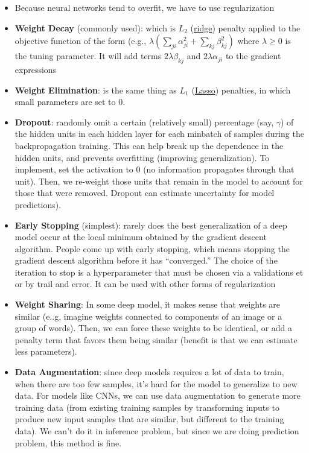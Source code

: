\documentclass[
]{book}
\begin{document}
\begin{itemize}
  \begin{itemize}
  \item
    Because neural networks tend to overfit, we have to use regularization
  \item
    \textbf{Weight Decay} (commonly used): which is \(L_2\) (\protect\hyperlink{ridge-regression}{ridge}) penalty applied to the objective function of the form (e.g., \(\lambda(\sum_{ji} \alpha_{ji}^2 + \sum_{kj} \beta_{kj}^2)\) where \(\lambda \ge 0\) is the tuning parameter. It will add terms \(2 \lambda \beta_{kj}\) and \(2 \lambda \alpha_{ji}\) to the gradient expressions
  \item
    \textbf{Weight Elimination}: is the same thing as \(L_1\) (\protect\hyperlink{lasso-regression}{Lasso}) penalties, in which small parameters are set to 0.
  \item
    \textbf{Dropout}: randomly omit a certain (relatively small) percentage (say, \(\gamma\)) of the hidden units in each hidden layer for each minbatch of samples during the backpropagation training. This can help break up the dependence in the hidden units, and prevents overfitting (improving generalization). To implement, set the activation to 0 (no information propagates through that unit). Then, we re-weight those units that remain in the model to account for those that were removed. Dropout can estimate uncertainty for model predictions).
  \item
    \textbf{Early Stopping} (simplest): rarely does the best generalization of a deep model occur at the local minimum obtained by the gradient descent algorithm. People come up with early stopping, which means stopping the gradient descent algorithm before it has ``converged.'' The choice of the iteration to stop is a hyperparameter that must be chosen via a validations et or by trail and error. It can be used with other forms of regularization
  \item
    \textbf{Weight Sharing}: In some deep model, it makes sense that weights are similar (e..g, imagine weights connected to components of an image or a group of words). Then, we can force these weights to be identical, or add a penalty term that favors them being similar (benefit is that we can estimate less parameters).
  \item
    \textbf{Data Augmentation}: since deep models requires a lot of data to train, when there are too few samples, it's hard for the model to generalize to new data. For models like CNNs, we can use data augmentation to generate more training data (from existing training samples by transforming inputs to produce new input samples that are similar, but different to the training data). We can't do it in inference problem, but since we are doing prediction problem, this method is fine.

\end{itemize}
\end{itemize}
\end{document}
